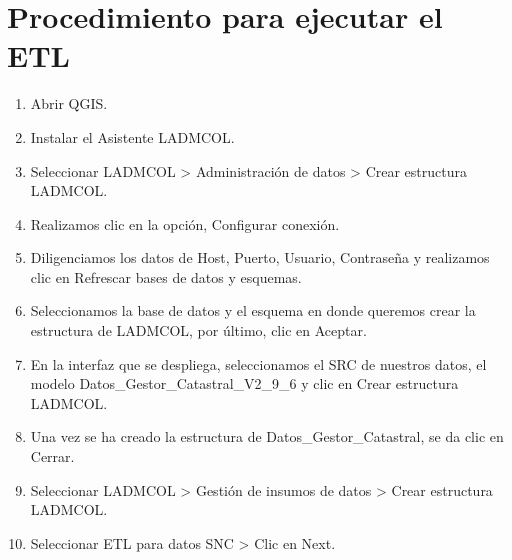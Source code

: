 \documentclass[letterpaper,10pt,spanish]{sphinxmanual}
\begin{document}
\section{Procedimiento para ejecutar el ETL}
\label{\detokenize{ETL_SNC/Process:procedimiento-para-ejecutar-el-etl}}\label{\detokenize{ETL_SNC/Process::doc}}\begin{enumerate}
%
\item {} 
Abrir QGIS.

\item {} 
Instalar el Asistente LADM\sphinxhyphen{}COL.

\item {} 
Seleccionar LADM\sphinxhyphen{}COL \sphinxhyphen{}\textgreater{} Administración de datos \sphinxhyphen{}\textgreater{} Crear estructura LADM\sphinxhyphen{}COL.

\item {} 
Realizamos clic en la opción, Configurar conexión.

\item {} 
Diligenciamos los datos de Host, Puerto, Usuario, Contraseña y realizamos clic en Refrescar bases de datos y esquemas.

\item {} 
Seleccionamos la base de datos y el esquema en donde queremos crear la estructura de LADM\sphinxhyphen{}COL, por último, clic en Aceptar.


\item {} 
En la interfaz que se despliega, seleccionamos el SRC de nuestros datos, el modelo Datos\_Gestor\_Catastral\_V2\_9\_6 y clic en Crear estructura LADM\sphinxhyphen{}COL.


\item {} 
Una vez se ha creado la estructura de Datos\_Gestor\_Catastral, se da clic en Cerrar.

\item {} 
Seleccionar LADM\sphinxhyphen{}COL \sphinxhyphen{}\textgreater{} Gestión de insumos de datos \sphinxhyphen{}\textgreater{} Crear estructura LADM\sphinxhyphen{}COL.

\item {} 
Seleccionar ETL para datos SNC \sphinxhyphen{}\textgreater{} Clic en Next.



\end{enumerate}
\end{document}
